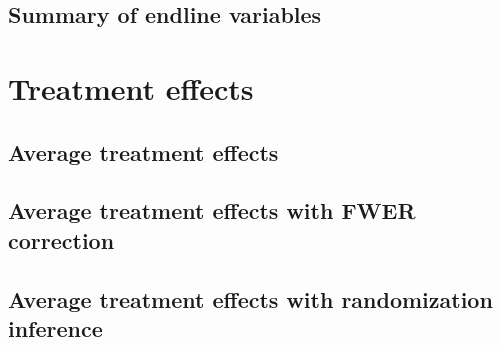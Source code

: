 \documentclass[11pt]{article}
\begin{document}
    	
    	
    	
    	
    	
        

    \clearpage

	\subsection{Summary of endline variables}

		
		
		
		
		
		

	\clearpage

\section{Treatment effects}

	\subsection{Average treatment effects}

		
        
        
		
		
		
		
		
		

	\clearpage

    \subsection{Average treatment effects with FWER correction}

        
        
        
        
        
        
        
        

    \clearpage

    \subsection{Average treatment effects with randomization inference}
\end{document}
